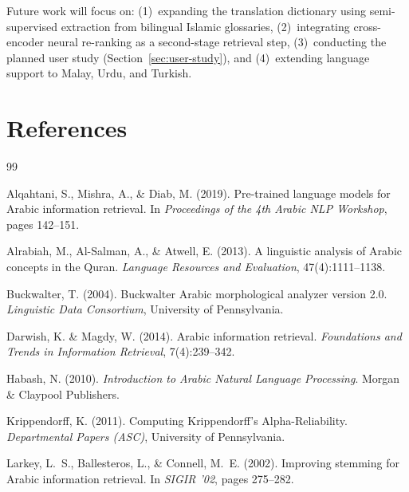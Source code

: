 \documentclass[preprint,12pt,authoryear]{elsarticle}
\begin{document}
Future work will focus on: (1)~expanding the translation dictionary using semi-supervised extraction from bilingual Islamic glossaries, (2)~integrating cross-encoder neural re-ranking as a second-stage retrieval step, (3)~conducting the planned user study (Section~\ref{sec:user-study}), and (4)~extending language support to Malay, Urdu, and Turkish.

\section*{References}

\begin{thebibliography}{99}

Alqahtani, S., Mishra, A., \& Diab, M. (2019).
\newblock Pre-trained language models for Arabic information retrieval.
\newblock In \textit{Proceedings of the 4th Arabic NLP Workshop}, pages 142--151.

Alrabiah, M., Al-Salman, A., \& Atwell, E. (2013).
\newblock A linguistic analysis of Arabic concepts in the Quran.
\newblock \textit{Language Resources and Evaluation}, 47(4):1111--1138.

Buckwalter, T. (2004).
\newblock Buckwalter Arabic morphological analyzer version 2.0.
\newblock \textit{Linguistic Data Consortium}, University of Pennsylvania.

Darwish, K. \& Magdy, W. (2014).
\newblock Arabic information retrieval.
\newblock \textit{Foundations and Trends in Information Retrieval}, 7(4):239--342.

Habash, N. (2010).
\newblock \textit{Introduction to Arabic Natural Language Processing}.
\newblock Morgan \& Claypool Publishers.

Krippendorff, K. (2011).
\newblock Computing Krippendorff's Alpha-Reliability.
\newblock \textit{Departmental Papers (ASC)}, University of Pennsylvania.

Larkey, L.~S., Ballesteros, L., \& Connell, M.~E. (2002).
\newblock Improving stemming for Arabic information retrieval.
\newblock In \textit{SIGIR '02}, pages 275--282.


\end{thebibliography}
\end{document}
